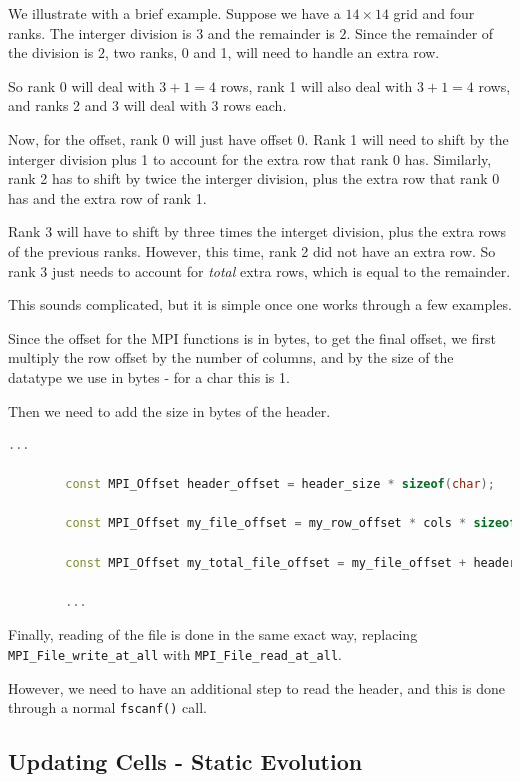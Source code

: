 \documentclass{report}
\begin{document}
We illustrate with a brief example. Suppose we have a $14\times 14$ grid and four 
ranks. The interger division is $3$ and the remainder is $2$. Since the 
remainder of the division is $2$, two ranks, 0 and 1, will need to handle an 
extra row. 

So rank 0 will deal with $3+1=4$ rows, rank 1 will also deal with $3+1=4$ rows, 
and ranks 2 and 3 will deal with $3$ rows each.

Now, for the offset, rank 0 will just have offset 0. Rank 1 will need to shift 
by the interger division plus 1 to account for the extra row that rank 0 has. 
Similarly, rank 2 has to shift by twice the interger division, plus the extra 
row that rank 0 has and the extra row of rank 1. 

Rank 3 will have to shift by three times the interget division, plus the extra 
rows of the previous ranks. However, this time, rank 2 did not have an extra 
row. So rank 3 just needs to account for \textit{total} extra rows, which is 
equal to the remainder. 

This sounds complicated, but it is simple once one works through a few examples.

Since the offset for the MPI functions is in bytes, to get the final 
offset, we first multiply the row offset by the number of columns, and by the 
size of the datatype we use in bytes - for a char this is 1.

Then we need to add the size in bytes of the header.

\begin{lstlisting}[language=C++]
        ...

        const MPI_Offset header_offset = header_size * sizeof(char);

        const MPI_Offset my_file_offset = my_row_offset * cols * sizeof(char);

        const MPI_Offset my_total_file_offset = my_file_offset + header_offset;

        ...
\end{lstlisting}

Finally, reading of the file is done in the same exact way, replacing 
\texttt{MPI\_File\_write\_at\_all} with \texttt{MPI\_File\_read\_at\_all}. 

However, we need to have an additional step to read the header, and this is done 
through a normal \texttt{fscanf()} call.

\subsection{Updating Cells - Static Evolution}
\end{document}
